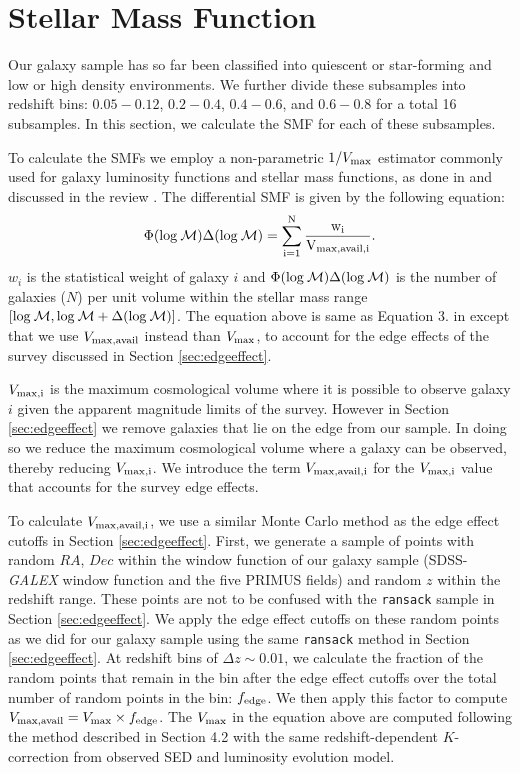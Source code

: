 \documentclass{emulateapj}
\begin{document}
\section{Stellar Mass Function} \label{sec:smf}
Our galaxy sample has so far been classified into quiescent or star-forming and low or high density environments. We further divide these subsamples into redshift bins: $0.05-0.12$, $0.2-0.4$, $0.4-0.6$, and $0.6-0.8$ for a total 16 subsamples. In this section, we calculate the SMF for each of these subsamples. 

To calculate the SMFs we employ a non-parametric $1/{V_{\rm{max}}}$ estimator commonly used for galaxy luminosity functions and stellar mass functions, as done in \cite{Moustakas:2013aa} and discussed in the review \cite{Johnston:2011aa}. The differential SMF is given by the following equation:
\begin{equation} \label{eq:phi}
\Phi(\rm{log}\: \mathcal{M}) \Delta(\rm{log} \:\mathcal{M}) = \sum\limits_{i=1}^{N} \frac{w_i}{V_{\rm{max,avail},i}}. 
\end{equation}
$w_i$ is the statistical weight of galaxy $i$ and $\Phi(\rm{log}\: \mathcal{M}) \Delta(\rm{log}\: \mathcal{M})$ is the number of galaxies ($N$) per unit volume within the stellar mass range $[\rm{log} \:\mathcal{M}, \rm{log} \:\mathcal{M}+\Delta(\rm{log} \:\mathcal{M})]$. The equation above is same as Equation 3. in \cite{Moustakas:2013aa} except that we use $V_{\rm{max,avail}}$ instead than $V_{\rm{max}}$, to account for the edge effects of the survey discussed in Section \ref{sec:edgeeffect}. 

$V_{\rm{max},i}$ is the maximum cosmological volume where it is possible to observe galaxy $i$ given the apparent magnitude limits of the survey. However in Section \ref{sec:edgeeffect} we remove galaxies that lie on the edge from our sample. In doing so we reduce the maximum cosmological volume where a galaxy can be observed, thereby reducing $V_{\rm{max},i}$. We introduce the term $V_{\rm{max,avail},i}$ for the $V_{\rm{max},i}$ value that accounts for the survey edge effects. 

To calculate $V_{\rm{max,avail},i}$, we use a similar Monte Carlo method as the edge effect cutoffs in Section \ref{sec:edgeeffect}. First, we generate a sample of points with random $RA$, $Dec$ within the window function of our galaxy sample (SDSS-{\em GALEX} window function and the five PRIMUS fields) and random $z$ within the redshift range. These points are not to be confused with the \texttt{ransack} sample in Section \ref{sec:edgeeffect}. We apply the edge effect cutoffs on these random points as we did for our galaxy sample using the same \texttt{ransack} method in Section \ref{sec:edgeeffect}. At redshift bins of $\Delta z \sim 0.01$, we calculate the fraction of the random points that remain in the bin after the edge effect cutoffs over the total number of random points in the bin: $f_{\rm{edge}}$. We then apply this factor to compute $V_{\rm{max,avail}} = V_{\rm{max}} \times f_{\rm{edge}}$. The $V_{\rm{max}}$ in the equation above are computed following the method described in \cite{Moustakas:2013aa} Section 4.2 with the same redshift-dependent $K$-correction from observed SED and luminosity evolution model.
\end{document}
